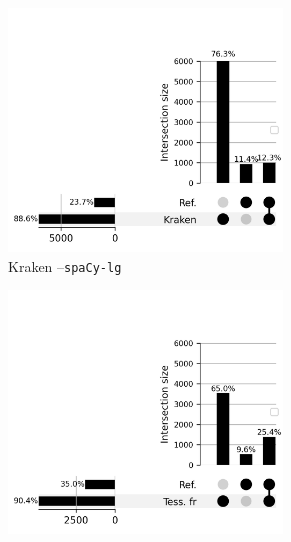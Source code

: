 \begin{figure}[h!]
    \begin{minipage}{6.5cm}
  \begin{subfigure}{1\textwidth}
  \includegraphics[width=0.8\textwidth]{IMAGES/ELTeC_INTERSECTIONS_spaCy3.5.1_12072024/DATA_ELTeC-fra_spaCy3.5.1_Kraken_upsetplot.png} 
  \caption{Kraken --\texttt{spaCy-lg}}
  \label{fig:ELTeCFRA_Kraken_spacy-lg-concat_intersection}
  \end{subfigure}
  \end{minipage}
  \begin{minipage}{6.5cm}
  \begin{subfigure}{1\textwidth}
  \includegraphics[width=0.8\textwidth]{IMAGES/ELTeC_INTERSECTIONS_spaCy3.5.1_12072024/DATA_ELTeC-fra_spaCy3.5.1_Tess. fr_upsetplot.png}

\end{subfigure}
\end{minipage}
\end{figure}
